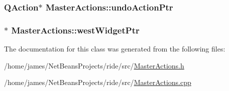 \hypertarget{class_master_actions_a23386959a2f60a89cc6ae1bff012c76c}{
\subsubsection[{undo\-Action\-Ptr}]{\setlength{\rightskip}{0pt plus 5cm}Q\-Action$\ast$ Master\-Actions\-::undo\-Action\-Ptr\hspace{0.3cm}{\ttfamily [private]}}}\label{class_master_actions_a23386959a2f60a89cc6ae1bff012c76c}
\hypertarget{class_master_actions_a84f8a14213e1f05a00f1855b41a973de}{
\subsubsection[{west\-Widget\-Ptr}]{$\ast$ Master\-Actions\-::west\-Widget\-Ptr\hspace{0.3cm}{\ttfamily [private]}}}\label{class_master_actions_a84f8a14213e1f05a00f1855b41a973de}


The documentation for this class was generated from the following files\-:\begin{DoxyCompactItemize}
\item 
/home/james/\-Net\-Beans\-Projects/ride/src/\hyperlink{_master_actions_8h}{Master\-Actions.\-h}\item 
/home/james/\-Net\-Beans\-Projects/ride/src/\hyperlink{_master_actions_8cpp}{Master\-Actions.\-cpp}\end{DoxyCompactItemize}
